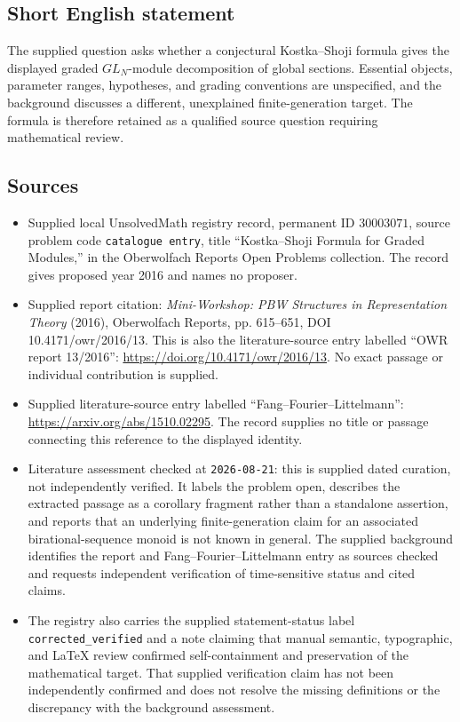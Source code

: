 \documentclass[11pt]{article}
\begin{document}
\subsection{Short English statement}
The supplied question asks whether a conjectural Kostka--Shoji formula gives the displayed graded \(GL_N\)-module decomposition of global sections. Essential objects, parameter ranges, hypotheses, and grading conventions are unspecified, and the background discusses a different, unexplained finite-generation target. The formula is therefore retained as a qualified source question requiring mathematical review.
\subsection{Sources}
\begin{itemize}
\item Supplied local UnsolvedMath registry record, permanent ID \(30003071\), source problem code \texttt{catalogue entry}, title ``Kostka--Shoji Formula for Graded Modules,'' in the Oberwolfach Reports Open Problems collection. The record gives proposed year 2016 and names no proposer.
\item Supplied report citation: \emph{Mini-Workshop: PBW Structures in Representation Theory} (2016), Oberwolfach Reports, pp. 615--651, DOI 10.4171/owr/2016/13. This is also the literature-source entry labelled ``OWR report 13/2016'': \url{https://doi.org/10.4171/owr/2016/13}. No exact passage or individual contribution is supplied.
\item Supplied literature-source entry labelled ``Fang--Fourier--Littelmann'': \url{https://arxiv.org/abs/1510.02295}. The record supplies no title or passage connecting this reference to the displayed identity.
\item Literature assessment checked at \texttt{2026-08-21}: this is supplied dated curation, not independently verified. It labels the problem open, describes the extracted passage as a corollary fragment rather than a standalone assertion, and reports that an underlying finite-generation claim for an associated birational-sequence monoid is not known in general. The supplied background identifies the report and Fang--Fourier--Littelmann entry as sources checked and requests independent verification of time-sensitive status and cited claims.
\item The registry also carries the supplied statement-status label \texttt{corrected\_verified} and a note claiming that manual semantic, typographic, and LaTeX review confirmed self-containment and preservation of the mathematical target. That supplied verification claim has not been independently confirmed and does not resolve the missing definitions or the discrepancy with the background assessment.
\end{itemize}
\end{document}
